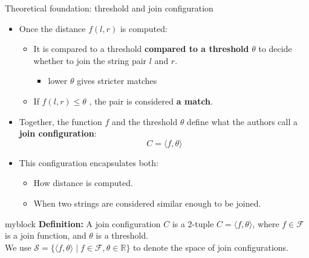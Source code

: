 \documentclass[8pt]{beamer} %
\begin{document}
\begin{frame}{Theoretical foundation: threshold and join configuration}
	
\begin{itemize}
	\item Once the distance $f(l, r)$ is computed:
	\begin{itemize}
		\item It is compared to a threshold \textbf{compared to a threshold} $\theta$  to decide whether to join the string pair $l$ and $r$.
		\begin{itemize}
			\item lower $\theta$ gives stricter matches
		\end{itemize}
		\item If $f(l, r) \leq \theta$ , the pair is considered \textbf{a match}.
	\end{itemize}
	\item 	Together, the function $f$ and the threshold $\theta$ define what the authors call a \textbf{join configuration}:$$
	C = \langle f, \theta \rangle
	$$
	\item This configuration encapsulates both:
	\begin{itemize}
		\item How distance is computed.
		\item When two strings are considered similar enough to be joined.
	\end{itemize}
\end{itemize}	

\begin{beamercolorbox}[rounded=true, shadow=true, leftskip=1em, rightskip=1em]{myblock}
	\textbf{Definition:} A join configuration $C$ is a 2-tuple $C = \langle f, \theta \rangle$, where $f \in \mathcal{F}$ is a join function, and $\theta$ is a threshold.\\
	We use $\mathcal{S} = \{ \langle f, \theta \rangle \mid f \in \mathcal{F}, \theta \in \mathbb{R} \}$ to denote the space of join configurations.
\end{beamercolorbox}

\end{frame}
\end{document}
